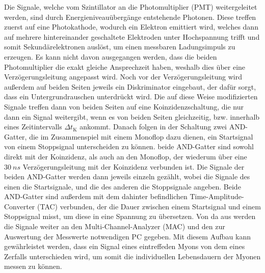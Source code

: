 Die Signale, welche vom Szintillator an die Photomultiplier (PMT) weitergeleitet werden, sind durch Energieniveauübergänge entstehende Photonen. Diese treffen zuerst auf eine Photokathode,
wodurch ein Elektron emittiert wird, welches dann auf mehrere hintereinander geschaltete Elektroden unter Hochspannung trifft und somit Sekundärelektronen auslöst, um einen messbaren
Ladungsimpuls zu erzeugen. Es kann nicht davon ausgegangen werden, dass die beiden Photomultiplier die exakt gleiche Ansprechzeit haben, weshalb dies über eine Verzögerungsleitung 
angepasst wird. Noch vor der Verzögerungsleitung wird außerdem auf beiden Seiten jeweils ein Diskriminator eingebaut, der dafür sorgt, dass ein Untergrundrauschen unterdrückt wird.
Die auf diese Weise modifizierten Signale treffen dann von beiden Seiten auf eine Koinzidenzschaltung, die nur dann ein Signal weitergibt, wenn es von beiden Seiten gleichzeitig,
bzw. innerhalb eines Zeitintervalls $\Delta t_\text{K} $ ankommt. 
Danach folgen in der Schaltung zwei AND-Gatter, die im Zusammenspiel mit einem Monoflop dazu dienen, ein Startsignal von einem Stoppsignal unterscheiden zu können. beide AND-Gatter
sind sowohl direkt mit der Koinzidenz, als auch an den Monoflop, der wiederum über eine $\SI{30}{ns}$ Verzögerungsleitung mit der Koinzidenz verbunden ist. Die Signale der beiden 
AND-Gatter werden dann jeweils einzeln gezählt, wobei die Signale des einen die Startsignale, und die des anderen die Stoppsignale angeben. Beide AND-Gatter sind außerdem mit 
dem dahinter befindlichen Time-Amplitude-Converter (TAC) verbunden, der die Dauer zwischen einem Startsignal und einem Stoppsignal misst, um diese in eine Spannung zu 
übersetzen. Von da aus werden die Signale weiter an den Multi-Channel-Analyzer (MAC) und den zur Auswertung der Messwerte notwendigen PC gegeben. Mit diesem Aufbau kann 
gewährleistet werden, dass ein Signal eines eintreffeden Myons von dem eines Zerfalls unterschieden wird, um somit die individuellen Lebensdauern der Myonen messen zu können. 